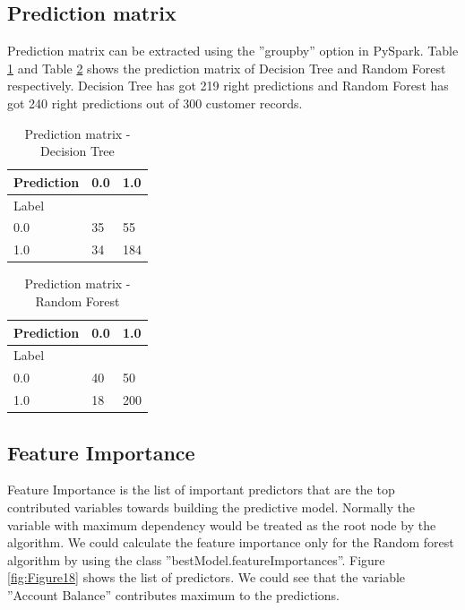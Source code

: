 \documentclass[sigconf]{acmart}
\begin{document}
\subsection{Prediction matrix} 

Prediction matrix can be extracted using the ''groupby'' option in PySpark. Table \ref{tab:table6} and Table \ref{tab:table7} shows the prediction matrix of Decision Tree and Random Forest respectively. Decision Tree has got 219 right predictions and Random Forest has got 240 right predictions out of 300 customer records.


\begin{table}[]
  \centering
  \caption{Prediction matrix - Decision Tree}
  \label{tab:table6}
  \begin{tabular}{|l|l|l|}
    \hline
    \multicolumn{1}{|c|}{Prediction} & 0.0       & 1.0       \\ \hline
    Label                            & \multicolumn{2}{l|}{} \\ \hline
    0.0                              & 35        & 55        \\ \hline
    1.0                              & 34        & 184       \\ \hline
  \end{tabular}
\end{table}

\begin{table}[]
  \centering
  \caption{Prediction matrix - Random Forest}
  \label{tab:table7}
  \begin{tabular}{|l|l|l|}
    \hline
    \multicolumn{1}{|c|}{Prediction} & 0.0       & 1.0       \\ \hline
    Label                            & \multicolumn{2}{l|}{} \\ \hline
    0.0                              & 40        & 50        \\ \hline
    1.0                              & 18        & 200       \\ \hline
  \end{tabular}
\end{table}

\subsection{Feature Importance} 

Feature Importance is the list of important predictors that are the top contributed variables towards building the predictive model. Normally the variable with maximum dependency would be treated as the root node by the algorithm. We could calculate the feature importance only for the Random forest algorithm by using the class ''bestModel.featureImportances''. Figure \ref{fig:Figure18} shows the list of predictors. We could see that the variable ''Account Balance'' contributes maximum to the predictions. 
\end{document}
